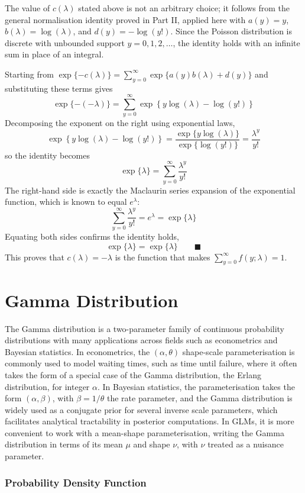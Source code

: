 \documentclass[12pt,a4paper]{report}
\begin{document}
The value of $c(\lambda)$ stated above is not an arbitrary choice; it follows from the general normalisation identity proved in Part II, applied here with $a(y) = y$, $b(\lambda) = \log(\lambda)$, and $d(y) = -\log(y!)$. Since the Poisson distribution is discrete with unbounded support $y=0,1,2,\dots$, the identity holds with an infinite sum in place of an integral.

Starting from $\exp\{-c(\lambda)\} = \sum_{y=0}^{\infty} \exp\{a(y)b(\lambda) + d(y)\}$ and substituting these terms gives
\[
\exp\{-(-\lambda)\} = \sum_{y=0}^{\infty} \exp\left\{y\log(\lambda) - \log(y!)\right\}
\]
Decomposing the exponent on the right using exponential laws,
\[
\exp\left\{y\log(\lambda) - \log(y!)\right\} = \frac{\exp\{y\log(\lambda)\}}{\exp\{\log(y!)\}} = \frac{\lambda^{y}}{y!}
\]
so the identity becomes
\[
\exp\{\lambda\} = \sum_{y=0}^{\infty} \frac{\lambda^{y}}{y!}
\]
The right-hand side is exactly the Maclaurin series expansion of the exponential function, which is known to equal $e^{\lambda}$:
\[
\sum_{y=0}^{\infty} \frac{\lambda^{y}}{y!} = e^{\lambda} = \exp\{\lambda\}
\]
Equating both sides confirms the identity holds,
\[
\exp\{\lambda\} = \exp\{\lambda\} \qquad \blacksquare
\]
This proves that $c(\lambda) = -\lambda$ is the function that makes $\sum_{y=0}^{\infty} f(y;\lambda) = 1$.

\section{Gamma Distribution}

The Gamma distribution is a two-parameter family of continuous probability distributions with many applications across fields such as econometrics and Bayesian statistics. In econometrics, the $(\alpha,\theta)$ shape-scale parameterisation is commonly used to model waiting times, such as time until failure, where it often takes the form of a special case of the Gamma distribution, the Erlang distribution, for integer $\alpha$. In Bayesian statistics, the parameterisation takes the form $(\alpha,\beta)$, with $\beta = 1/\theta$ the rate parameter, and the Gamma distribution is widely used as a conjugate prior for several inverse scale parameters, which facilitates analytical tractability in posterior computations. In GLMs, it is more convenient to work with a mean-shape parameterisation, writing the Gamma distribution in terms of its mean $\mu$ and shape $\nu$, with $\nu$ treated as a nuisance parameter.

\subsubsection*{Probability Density Function}
\end{document}
